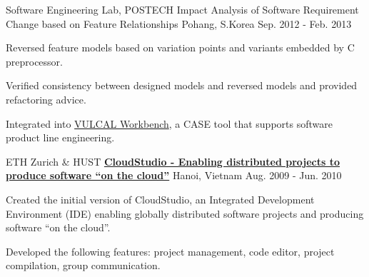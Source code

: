 \begin{cventries}
\cventry
{Software Engineering Lab, POSTECH } %
{Impact Analysis of Software Requirement Change based on Feature Relationships} %
{Pohang, S.Korea} %
{Sep. 2012 - Feb. 2013} %
{
  \begin{cvitems} %
    \item Reversed feature models based on variation points and variants embedded by C preprocessor.
    \item Verified consistency between designed models and reversed models and provided refactoring advice.
    \item Integrated into \href{http://productlinetech.com}{VULCAL Workbench}, a CASE tool that supports software product line engineering.
  \end{cvitems} 
}
    
\cventry
{{ETH Zurich} \&  HUST} %
{\href{http://se.inf.ethz.ch/research/cloudstudio/}{\bf CloudStudio - Enabling distributed projects to produce software “on the cloud”}} %
{Hanoi, Vietnam} %
{Aug. 2009 - Jun. 2010} %
{
  \begin{cvitems} %
   \item Created the initial version of CloudStudio, an Integrated Development Environment (IDE) enabling globally distributed software projects and producing software ``on the cloud”.
   \item Developed the following features: project management, code editor, project compilation, group communication.
  \end{cvitems}
}

\end{cventries}
